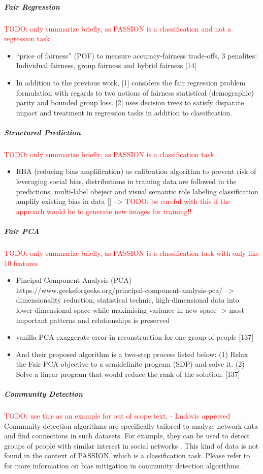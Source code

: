 \documentclass[12pt, a4paper, oneside]{book}   	%
\renewcommand{\todo}[1]{\textcolor{red}{TODO: #1}}
\begin{document}
			\subparagraph{Fair Regression}
				\todo{only summarize briefly, as PASSION is a classification and not a regression task}
				\begin{itemize}
					\item “price of fairness” (POF) to measure accuracy-fairness trade-offs, 3 penalites: Individual fairness, group fairness and hybrid fairness [14] \autocite{Mehrabi_2021}
					\item In addition to the previous work, [1] considers the fair regression problem formulation with regards to two notions of fairness statistical (demographic) parity and bounded group loss. [2] uses decision trees to satisfy disparate impact and treatment in regression tasks in addition to classification. \autocite{Mehrabi_2021}
				\end{itemize}
			\subparagraph{Structured Prediction}
				\todo{only summarize briefly, as PASSION is a classification task}
				\begin{itemize}
					\item RBA (reducing bias amplification) as calibration algorithm to prevent risk of leveraging social bias, distributions in training data are followed in the predictions. multi-label obeject and visual semantic role labeling classification amplify existing bias in data [\autocite{M167_Zhao_2017}] \autocite{Mehrabi_2021} --> \todo{be careful with this if the approach would be to generate new images for training!!}
				\end{itemize}
			\subparagraph{Fair PCA}
				\todo{only summarize briefly, as PASSION is a classification task with only like 10 features}
				\begin{itemize}
					\item Pincipal Component Analysis (PCA) https://www.geeksforgeeks.org/principal-component-analysis-pca/ --> dimensionality reduction, statistical technic, high-dimensional data into lower-dimensional space while maximising variance in new space -> most important patterns and relationships is preserved
					\item vanilla PCA exaggerate error in reconstruction for one group of people [137] \autocite{Mehrabi_2021}
					\item And their proposed algorithm is a two-step process listed below: (1) Relax the Fair PCA objective to a semidefinite program (SDP) and solve it. (2) Solve a linear program that would reduce the rank of the solution. [137] \autocite{Mehrabi_2021}
				\end{itemize}
			\subparagraph{Community Detection}
				\todo{use this as an example for out of scope text, - Ludovic approved}
				Community detection algorithms are specifically tailored to analyze network data and find connections in such datasets. For example, they can be used to detect groups of people with similar interest in social networks \autocite{Jayawickrama_2021}. This kind of data is not found in the context of PASSION, which is a classification task. Please refer to \textcite{Mehrabi_2021} for more information on bias mitigation in community detection algorithms.
				
\end{document}
